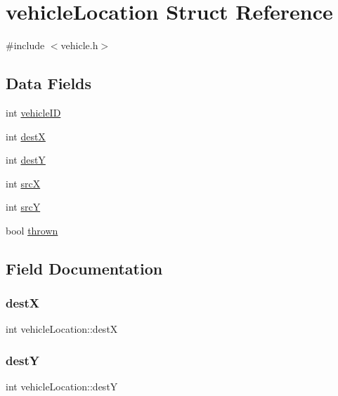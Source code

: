 \hypertarget{structvehicle_location}{}\section{vehicle\+Location Struct Reference}
\label{structvehicle_location}


{\ttfamily \#include $<$vehicle.\+h$>$}

\subsection*{Data Fields}
\begin{DoxyCompactItemize}
\item 
int \hyperlink{structvehicle_location_a70065ae251ef62afa90db7325f61de5d}{vehicle\+ID}
\item 
int \hyperlink{structvehicle_location_ae2c2d54e5216c01d7b94fcd65df03412}{destX}
\item 
int \hyperlink{structvehicle_location_a30fc61b13c35742bd18735ab17bcfa82}{destY}
\item 
int \hyperlink{structvehicle_location_a89558db4d4c00dc425fe0e5a7ff56cab}{srcX}
\item 
int \hyperlink{structvehicle_location_ac2038a17b0a32d5b4485c0a8bb61a954}{srcY}
\item 
bool \hyperlink{structvehicle_location_af71ecab56cec29c594fb46d1bb14db16}{thrown}
\end{DoxyCompactItemize}


\subsection{Field Documentation}
\hypertarget{structvehicle_location_ae2c2d54e5216c01d7b94fcd65df03412}{}\label{structvehicle_location_ae2c2d54e5216c01d7b94fcd65df03412} 
\subsubsection{\texorpdfstring{destX}{destX}}
{\footnotesize\ttfamily int vehicle\+Location\+::destX}

\hypertarget{structvehicle_location_a30fc61b13c35742bd18735ab17bcfa82}{}\label{structvehicle_location_a30fc61b13c35742bd18735ab17bcfa82} 
\subsubsection{\texorpdfstring{destY}{destY}}
{\footnotesize\ttfamily int vehicle\+Location\+::destY}

